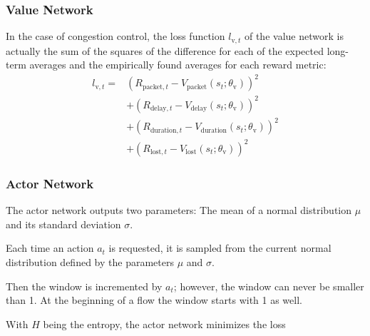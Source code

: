 \documentclass[sigconf]{acmart}
\newcommand\givenbase[1][]{\:#1\lvert\:}
\let\given\givenbase
\begin{document}
\subsubsection{Value Network}
\label{subsubsec:value}

In the case of congestion control, the loss function $l_{\text{v},t}$ of the value network is actually the sum of the squares of the difference for each of the expected long-term averages and the empirically found averages for each reward metric:
\begin{align*}
l_{\text{v},t} =& \left(R_{\text{packet},t} - V_\text{packet}(s_t; \theta_\text{v})\right)^2 \\
&+\left(R_{\text{delay},t} - V_\text{delay}(s_t; \theta_\text{v})\right)^2 \\
&+\left(R_{\text{duration},t} - V_\text{duration}(s_t; \theta_\text{v})\right)^2 \\
&+\left(R_{\text{lost},t} - V_\text{lost}(s_t; \theta_\text{v})\right)^2
\end{align*}

\subsubsection{Actor Network}
\label{subsubsec:actor}

The actor network outputs two parameters: The mean of a normal distribution $\mu$ and its standard deviation $\sigma$. 

Each time an action $a_t$ is requested, it is sampled from the current normal distribution defined by the parameters $\mu$ and $\sigma$.

Then the window is incremented by $a_t$; however, the window can never be smaller than 1. At the beginning of a flow the window starts with 1 as well.

With $H$ being the entropy, the actor network minimizes the loss
\end{document}
